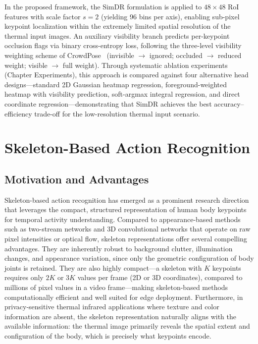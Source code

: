 In the proposed framework, the SimDR formulation is applied to $48 \times 48$ RoI features with scale factor $s = 2$ (yielding 96 bins per axis), enabling sub-pixel keypoint localization within the extremely limited spatial resolution of the thermal input images. An auxiliary visibility branch predicts per-keypoint occlusion flags via binary cross-entropy loss, following the three-level visibility weighting scheme of CrowdPose~\cite{li2019crowdpose} (invisible $\rightarrow$ ignored; occluded $\rightarrow$ reduced weight; visible $\rightarrow$ full weight). Through systematic ablation experiments (Chapter Experiments), this approach is compared against four alternative head designs---standard 2D Gaussian heatmap regression, foreground-weighted heatmap with visibility prediction, soft-argmax integral regression, and direct coordinate regression---demonstrating that SimDR achieves the best accuracy--efficiency trade-off for the low-resolution thermal input scenario.

\section{Skeleton-Based Action Recognition}
\label{sec:rw_action}

\subsection*{Motivation and Advantages}

Skeleton-based action recognition has emerged as a prominent research direction that leverages the compact, structured representation of human body keypoints for temporal activity understanding. Compared to appearance-based methods such as two-stream networks and 3D convolutional networks that operate on raw pixel intensities or optical flow, skeleton representations offer several compelling advantages. They are inherently robust to background clutter, illumination changes, and appearance variation, since only the geometric configuration of body joints is retained. They are also highly compact---a skeleton with $K$ keypoints requires only $2K$ or $3K$ values per frame (2D or 3D coordinates), compared to millions of pixel values in a video frame---making skeleton-based methods computationally efficient and well suited for edge deployment. Furthermore, in privacy-sensitive thermal infrared applications where texture and color information are absent, the skeleton representation naturally aligns with the available information: the thermal image primarily reveals the spatial extent and configuration of the body, which is precisely what keypoints encode.

